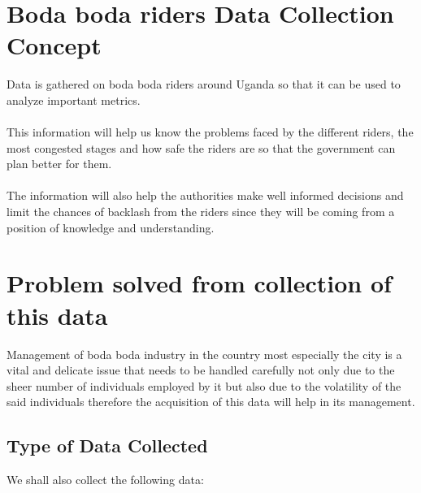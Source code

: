 \documentclass{article}               %
\begin{document}

\section*{Boda boda riders Data Collection Concept}

Data is gathered on boda boda riders around Uganda so that it can be used to analyze important metrics.\\
\\This information will help us know the problems faced by the different riders, the most congested stages and how safe the riders are so that the government can plan better for them.\\
\\The information will also help the authorities make well informed decisions and limit the chances of backlash from the riders since they will be coming from a position of knowledge and understanding.

\section*{Problem solved from collection of this data}
Management of boda boda industry in the country most especially the city is a vital and delicate issue that needs to be handled carefully not only due to the sheer number of individuals employed by it but also due to the volatility of the said individuals therefore the acquisition of this data will help in its management.

\subsection*{Type of Data Collected}
 We shall also collect the following data:
\end{document}
